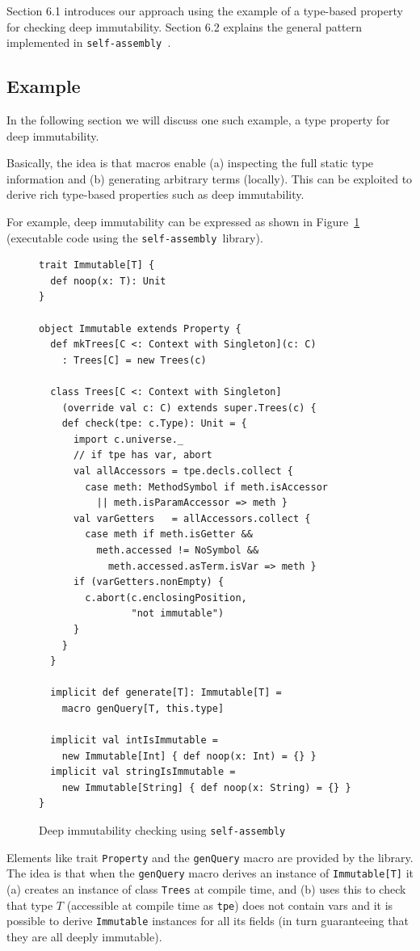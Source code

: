 \documentclass[preprint]{sigplanconf}
\newcommand{\selfassembly}{\texttt{self-assembly~}}
\begin{document}
Section 6.1 introduces our approach using the example of a type-based property for checking deep immutability. Section 6.2 explains the general pattern implemented in \selfassembly.

\subsection{Example}

In the following section we will discuss one such example, a type property for
deep immutability.

Basically, the idea is that macros enable (a) inspecting the full static type
information and (b) generating arbitrary terms (locally). This can be
exploited to derive rich type-based properties such as deep immutability.

For example, deep immutability can be expressed as shown in
Figure~\ref{fig:immutable} (executable code using the \selfassembly library).

\begin{figure}
\centering
\begin{lstlisting}
trait Immutable[T] {
  def noop(x: T): Unit
}

object Immutable extends Property {
  def mkTrees[C <: Context with Singleton](c: C)
    : Trees[C] = new Trees(c)

  class Trees[C <: Context with Singleton]
    (override val c: C) extends super.Trees(c) {
    def check(tpe: c.Type): Unit = {
      import c.universe._
      // if tpe has var, abort
      val allAccessors = tpe.decls.collect {
        case meth: MethodSymbol if meth.isAccessor
          || meth.isParamAccessor => meth }
      val varGetters   = allAccessors.collect {
        case meth if meth.isGetter &&
          meth.accessed != NoSymbol &&
            meth.accessed.asTerm.isVar => meth }
      if (varGetters.nonEmpty) {
        c.abort(c.enclosingPosition,
                "not immutable")
      }
    }
  }

  implicit def generate[T]: Immutable[T] =
    macro genQuery[T, this.type]

  implicit val intIsImmutable =
    new Immutable[Int] { def noop(x: Int) = {} }
  implicit val stringIsImmutable =
    new Immutable[String] { def noop(x: String) = {} }
}
\end{lstlisting}
  \caption{Deep immutability checking using \selfassembly}
  \label{fig:immutable}
\end{figure}

Elements like trait \verb|Property| and the \verb|genQuery| macro are provided by the
library. The idea is that when the \verb|genQuery| macro derives an instance of
\verb|Immutable[T]| it (a) creates an instance of class \verb|Trees| at compile time, and
(b) uses this to check that type $T$ (accessible at compile time as \verb|tpe|) does
not contain vars and it is possible to derive \verb|Immutable| instances for all its
fields (in turn guaranteeing that they are all deeply immutable).
\end{document}
